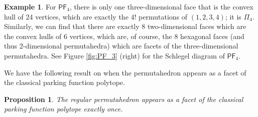 \documentclass[11pt]{amsart}
\newtheorem{proposition}[theorem]{Proposition}
\theoremstyle{definition}
\newtheorem{example}[theorem]{Example}
\newcommand{\0}{\emptyset}
\newcommand{\PF}{\mathsf{PF}}
\begin{document}
\begin{example}
For $\PF_4$, there is only one three-dimensional face that is the convex hull of 24 vertices, which are exactly the $4!$ permutations of $(1,2,3,4)$; it is $\Pi_4$. 
Similarly, we can find that there are exactly 8 two-dimensional faces which are the convex hulls of 6 vertices, which are, of course, the 8 hexagonal faces (and thus 2-dimensional permutahedra) which are facets of the three-dimensional permutahedra. See Figure \ref{fig:PF_3} (right) for the Schlegel diagram of $\PF_4$.
\end{example}

We have the following result on when the permutahedron appears as a facet of the classical parking function polytope.

\begin{proposition}\label{prop:permutahedron}
The regular permutahedron appears as a facet of the classical parking function polytope exactly once. 
\end{proposition}
\end{document}
